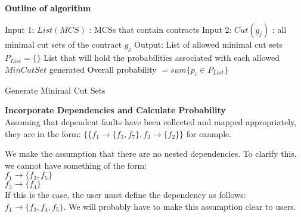 \textbf{Outline of algorithm}\\

\begin{algorithm}[H]
	Input 1: $List(MCS)$ : MCSs that contain contracts \;
	Input 2: $Cut(g_j)$ : all minimal cut sets of the contract $g_j$ \;
	Output: List of allowed minimal cut sets \;
	$P_{List} = \{\}$ List that will hold the probabilities associated with each allowed $MinCutSet$ generated \;
	Overall probability $= sum\{p_i \in P_{List}\}$ \;
	\caption{Generate Minimal Cut Sets}
	\label{alg:repl_alg}
\end{algorithm}

\textbf{Incorporate Dependencies and Calculate Probability}\\
Assuming that dependent faults have been collected and mapped appropriately, they are in the form: $\{\{f_1 \rightarrow\{f_3, f_7\}, f_3 \rightarrow\{f_2\}\}$ for example. 

We make the assumption that there are no nested dependencies. To clarify this, we cannot have something of the form: \\
$f_1 \rightarrow \{f_3, f_5\}$\\
$f_3 \rightarrow \{f_4\}$\\

If this is the case, the user must define the dependency as follows: $f_1 \rightarrow \{f_3, f_4, f_5\}$. We will probably have to make this assumption clear to users.\\ 

